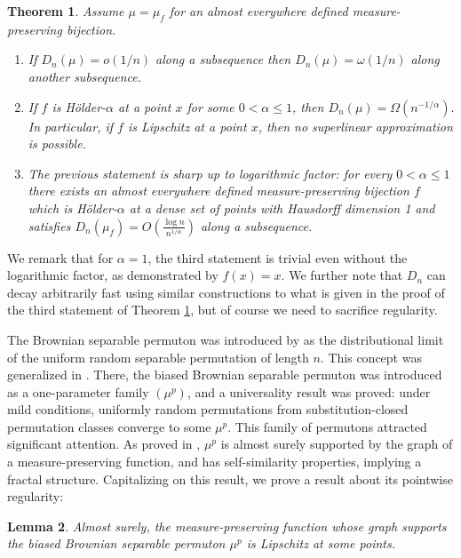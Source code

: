 \documentclass{article}
\newtheorem{theorem}{Theorem}[section]
\newtheorem{lemma}[theorem]{Lemma}
\theoremstyle{definition}
\begin{document}
\begin{theorem} \label{thm:regular_not_approximable}
    Assume $\mu=\mu_f$ for an almost everywhere defined measure-preserving bijection.
    \begin{enumerate}
        \item If $D_n(\mu)=o(1/n)$ along a subsequence then $D_n(\mu)=\omega(1/n)$ along another subsequence.
        \item If $f$ is Hölder-$\alpha$ at a point $x$ for some $0<\alpha\leq 1$, then $D_n(\mu)=\Omega(n^{-1/\alpha}).$ In particular, if $f$ is Lipschitz at a point $x$, then no superlinear approximation is possible.
    \item The previous statement is sharp up to logarithmic factor: for every $0<\alpha\leq 1$ there exists an almost everywhere defined measure-preserving bijection $f$ which is Hölder-$\alpha$ at a dense set of points with Hausdorff dimension 1 and satisfies $D_n(\mu_f)=O\left(\frac{\log n} {n^{1/\alpha}}\right)$ along a subsequence.
    \end{enumerate}
\end{theorem}

We remark that for $\alpha=1$, the third statement is trivial even without the logarithmic factor, as demonstrated by $f(x)=x$. We further note that $D_n$ can decay arbitrarily fast using similar constructions to what is given in the proof of the third statement of Theorem \ref{thm:regular_not_approximable}, but of course we need to sacrifice regularity.

The Brownian separable permuton was introduced by \cite{Bassino2018} as the distributional limit of the uniform random separable permutation of length $n$. This concept was generalized in \cite{Bassino2017}. There, the biased Brownian separable permuton was introduced as a one-parameter family \((\mu^p)\), and a universality result was proved: under mild conditions, uniformly random permutations from substitution-closed permutation classes converge to some \(\mu^p\). This family of permutons attracted significant attention. As proved in \cite{Maazoun_2020}, $\mu^p$ is almost surely supported by the graph of a measure-preserving function, and has self-similarity properties, implying a fractal structure. Capitalizing on this result, we prove a result about its pointwise regularity:

\begin{lemma}\label{lemma:brownian_lip}
    Almost surely, the measure-preserving function whose graph supports the biased Brownian separable permuton $\mu^p$ is Lipschitz at some points.
\end{lemma}
\end{document}
